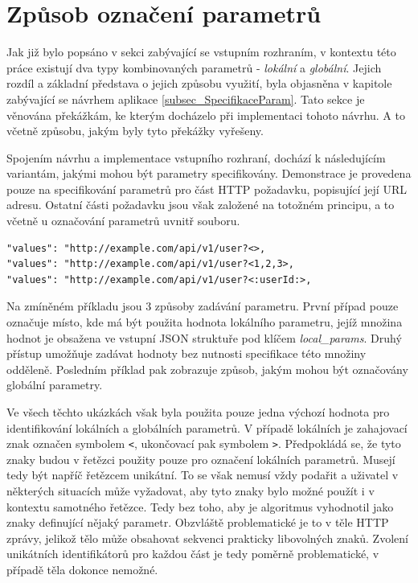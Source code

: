 \section{Způsob označení parametrů}

Jak již bylo popsáno v sekci zabývající se vstupním rozhraním, v kontextu této práce existují dva typy kombinovaných parametrů - \textit{lokální} a \textit{globální}. Jejich rozdíl a základní představa o jejich způsobu využití, byla objasněna v kapitole zabývající se návrhem aplikace \ref{subsec_SpecifikaceParam}. Tato sekce je věnována překážkám, ke kterým docházelo při implementaci tohoto návrhu. A to včetně způsobu, jakým byly tyto překážky vyřešeny.

Spojením návrhu a implementace vstupního rozhraní, dochází k následujícím variantám, jakými mohou být parametry specifikovány. Demonstrace je provedena pouze na specifikování parametrů pro část HTTP požadavku, popisující její URL adresu. Ostatní části požadavku jsou však založené na totožném principu, a to včetně u označování parametrů uvnitř souboru. 
\begin{lstlisting}[frame=single]
"values": "http://example.com/api/v1/user?<>,
"values": "http://example.com/api/v1/user?<1,2,3>,
"values": "http://example.com/api/v1/user?<:userId:>,
\end{lstlisting}

Na zmíněném příkladu jsou 3 způsoby zadávání parametru. První případ pouze označuje místo, kde má být použita hodnota lokálního parametru, jejíž množina hodnot je obsažena ve vstupní JSON struktuře pod klíčem \textit{local\_params}. Druhý přístup umožňuje zadávat hodnoty bez nutnosti specifikace této množiny odděleně. Posledním příklad pak zobrazuje způsob, jakým mohou být označovány globální parametry.

Ve všech těchto ukázkách však byla použita pouze jedna výchozí hodnota pro identifikování lokálních a globálních parametrů. V případě lokálních je zahajovací znak označen symbolem \texttt{<}, ukončovací pak symbolem \texttt{>}. Předpokládá se, že tyto znaky budou v řetězci použity pouze pro označení lokálních parametrů. Musejí tedy být napříč řetězcem unikátní. To se však nemusí vždy podařit a uživatel v některých situacích může vyžadovat, aby tyto znaky bylo možné použít i v kontextu samotného řetězce. Tedy bez toho, aby je algoritmus vyhodnotil jako znaky definující nějaký parametr. Obzvláště problematické je to v těle HTTP zprávy, jelikož tělo může obsahovat sekvenci prakticky libovolných znaků. Zvolení unikátních identifikátorů pro každou část je tedy poměrně problematické, v případě těla dokonce nemožné.


